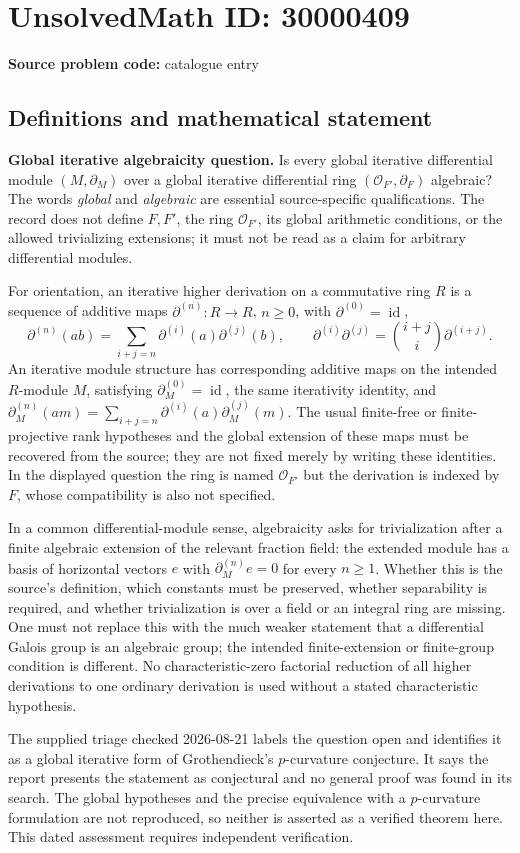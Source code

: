 \documentclass[11pt]{article}
\begin{document}
\section*{UnsolvedMath ID: 30000409}
\textbf{Source problem code:} catalogue entry
\subsection{Definitions and mathematical statement}
\textbf{Global iterative algebraicity question.} Is every global iterative differential module \((M,\partial_M)\) over a global iterative differential ring \((\mathcal O_{F'},\partial_F)\) algebraic? The words \emph{global} and \emph{algebraic} are essential source-specific qualifications. The record does not define \(F,F'\), the ring \(\mathcal O_{F'}\), its global arithmetic conditions, or the allowed trivializing extensions; it must not be read as a claim for arbitrary differential modules.\par For orientation, an iterative higher derivation on a commutative ring \(R\) is a sequence of additive maps \(\partial^{(n)}:R\to R\), \(n\ge0\), with \(\partial^{(0)}=\operatorname{id}\),\[\partial^{(n)}(ab)=\sum_{i+j=n}\partial^{(i)}(a)\partial^{(j)}(b),\qquad \partial^{(i)}\partial^{(j)}=\binom{i+j}{i}\partial^{(i+j)}.\] An iterative module structure has corresponding additive maps on the intended \(R\)-module \(M\), satisfying \(\partial_M^{(0)}=\operatorname{id}\), the same iterativity identity, and \(\partial_M^{(n)}(am)=\sum_{i+j=n}\partial^{(i)}(a)\partial_M^{(j)}(m)\). The usual finite-free or finite-projective rank hypotheses and the global extension of these maps must be recovered from the source; they are not fixed merely by writing these identities. In the displayed question the ring is named \(\mathcal O_{F'}\) but the derivation is indexed by \(F\), whose compatibility is also not specified.\par In a common differential-module sense, algebraicity asks for trivialization after a finite algebraic extension of the relevant fraction field: the extended module has a basis of horizontal vectors \(e\) with \(\partial_M^{(n)}e=0\) for every \(n\ge1\). Whether this is the source's definition, which constants must be preserved, whether separability is required, and whether trivialization is over a field or an integral ring are missing. One must not replace this with the much weaker statement that a differential Galois group is an algebraic group; the intended finite-extension or finite-group condition is different. No characteristic-zero factorial reduction of all higher derivations to one ordinary derivation is used without a stated characteristic hypothesis.\par The supplied triage checked 2026-08-21 labels the question open and identifies it as a global iterative form of Grothendieck's \(p\)-curvature conjecture. It says the report presents the statement as conjectural and no general proof was found in its search. The global hypotheses and the precise equivalence with a \(p\)-curvature formulation are not reproduced, so neither is asserted as a verified theorem here. This dated assessment requires independent verification.
\end{document}
